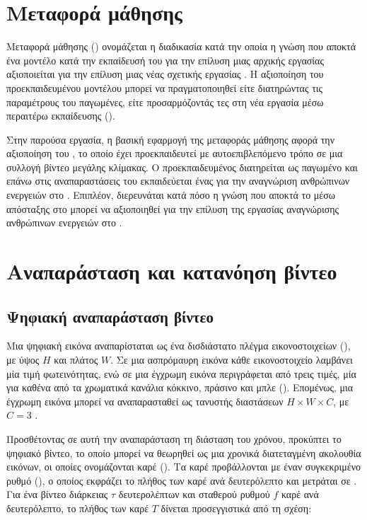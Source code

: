 \section{Μεταφορά μάθησης}
\label{sec:transfer-learning}

Μεταφορά μάθησης () ονομάζεται η διαδικασία κατά
την οποία η γνώση που αποκτά ένα μοντέλο κατά την εκπαίδευσή του για
την επίλυση μιας αρχικής εργασίας αξιοποιείται για την
επίλυση μιας νέας σχετικής εργασίας \cite{zhuang2020transfer}. Η αξιοποίηση του προεκπαιδευμένου μοντέλου
μπορεί να πραγματοποιηθεί είτε διατηρώντας τις παραμέτρους του παγωμένες,
είτε προσαρμόζοντάς τες στη νέα εργασία μέσω περαιτέρω εκπαίδευσης
().

Στην παρούσα εργασία, η βασική εφαρμογή της μεταφοράς μάθησης αφορά την
αξιοποίηση του , το οποίο έχει προεκπαιδευτεί με
αυτοεπιβλεπόμενο τρόπο σε μια συλλογή βίντεο μεγάλης κλίμακας. Ο
προεκπαιδευμένος  διατηρείται ως παγωμένο
 και επάνω στις αναπαραστάσεις του εκπαιδεύεται ένας
 για την αναγνώριση ανθρώπινων ενεργειών στο
. Επιπλέον, διερευνάται κατά πόσο η γνώση που αποκτά το 
 μέσω απόσταξης στο  μπορεί να αξιοποιηθεί
 για την επίλυση της εργασίας αναγνώρισης ανθρώπινων ενεργειών στο .

\section{Αναπαράσταση και κατανόηση βίντεο}
\label{sec:video-understanding}

\subsection{Ψηφιακή αναπαράσταση βίντεο}
\label{subsec:video-representation}

Μια ψηφιακή εικόνα αναπαρίσταται ως ένα δισδιάστατο πλέγμα
εικονοστοιχείων (), με ύψος \(H\) και πλάτος \(W\). Σε μια
ασπρόμαυρη εικόνα κάθε εικονοστοιχείο λαμβάνει μία τιμή φωτεινότητας,
ενώ σε μια έγχρωμη εικόνα περιγράφεται από τρεις τιμές, μία για καθένα
από τα χρωματικά κανάλια κόκκινο, πράσινο και μπλε ().
Επομένως, μια έγχρωμη εικόνα μπορεί να αναπαρασταθεί ως τανυστής
διαστάσεων \(H\times W\times C\), με \(C=3\)
\cite{tekalp2015digital}.

Προσθέτοντας σε αυτή την αναπαράσταση τη διάσταση του χρόνου, προκύπτει
το ψηφιακό βίντεο, το οποίο μπορεί να θεωρηθεί ως μια χρονικά
διατεταγμένη ακολουθία εικόνων, οι οποίες ονομάζονται καρέ
(). Τα καρέ
προβάλλονται με έναν συγκεκριμένο ρυθμό (), ο οποίος
εκφράζει το πλήθος των καρέ ανά δευτερόλεπτο και μετράται σε
 \cite{tekalp2015digital}. Για ένα βίντεο διάρκειας \(\tau\) δευτερολέπτων και σταθερού ρυθμού
\(f\) καρέ ανά δευτερόλεπτο, το πλήθος των καρέ \(T\) δίνεται
προσεγγιστικά από τη σχέση:

